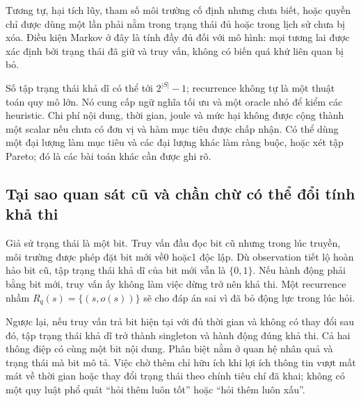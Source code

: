Tương tự, hại tích lũy, tham số môi trường cố định nhưng chưa biết, hoặc quyền chỉ được dùng một lần phải nằm trong trạng thái đủ hoặc trong lịch sử chưa bị xóa. Điều kiện Markov ở đây là tính đầy đủ đối với mô hình: mọi tương lai được xác định bởi trạng thái đã giữ và truy vấn, không có biến quá khứ liên quan bị bỏ.

Số tập trạng thái khả dĩ có thể tới $2^{|S|}-1$; recurrence không tự là một thuật toán quy mô lớn. Nó cung cấp ngữ nghĩa tối ưu và một oracle nhỏ để kiểm các heuristic. Chi phí nội dung, thời gian, joule và mức hại không được cộng thành một scalar nếu chưa có đơn vị và hàm mục tiêu được chấp nhận. Có thể dùng một đại lượng làm mục tiêu và các đại lượng khác làm ràng buộc, hoặc xét tập Pareto; đó là các bài toán khác cần được ghi rõ.

\subsection{Tại sao quan sát cũ và chần chừ có thể đổi tính khả thi}
Giả sử trạng thái là một bit. Truy vấn đầu đọc bit cũ nhưng trong lúc truyền, môi trường được phép đặt bit mới về0 hoặc1 độc lập. Dù observation tiết lộ hoàn hảo bit cũ, tập trạng thái khả dĩ của bit mới vẫn là $\{0,1\}$. Nếu hành động phải bằng bit mới, truy vấn ấy không làm việc dừng trở nên khả thi. Một recurrence nhầm $R_q(s)=\{(s,o(s))\}$ sẽ cho đáp án sai vì đã bỏ động lực trong lúc hỏi.

Ngược lại, nếu truy vấn trả bit hiện tại với đủ thời gian và không có thay đổi sau đó, tập trạng thái khả dĩ trở thành singleton và hành động đúng khả thi. Cả hai thông điệp có cùng một bit nội dung. Phân biệt nằm ở quan hệ nhân quả và trạng thái mà bit mô tả. Việc chờ thêm chỉ hữu ích khi lợi ích thông tin vượt mất mát về thời gian hoặc thay đổi trạng thái theo chính tiêu chí đã khai; không có một quy luật phổ quát ``hỏi thêm luôn tốt'' hoặc ``hỏi thêm luôn xấu''.
